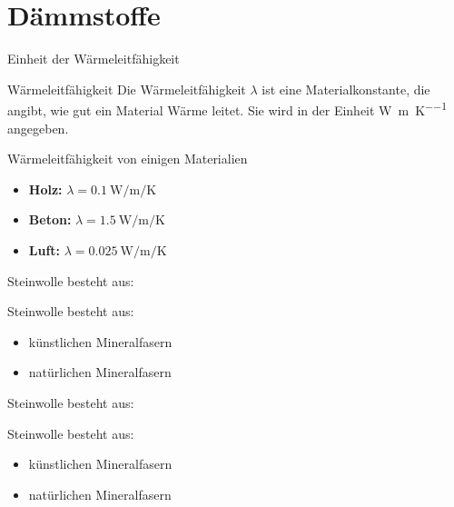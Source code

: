 \section{Dämmstoffe}
\BlueSectionSlide
\begin{frame}{Einheit der Wärmeleitfähigkeit}
	\begin{Definition_BS}{Wärmeleitfähigkeit}
		Die Wärmeleitfähigkeit $\lambda$ ist eine Materialkonstante, die angibt, wie gut ein Material Wärme leitet. Sie wird in der Einheit \si{\watt\per\meter\per\kelvin} angegeben.
	\end{Definition_BS}
	\pause
	\begin{Beispiel}{Wärmeleitfähigkeit von einigen Materialien}
		\begin{itemize}
			\item[\textbullet] \textbf{Holz:} $\lambda = \SI{0.1}{\watt\per\meter\per\kelvin}$
			\item[\textbullet] \textbf{Beton:} $\lambda = \SI{1.5}{\watt\per\meter\per\kelvin}$
			\item[\textbullet] \textbf{Luft:} $\lambda = \SI{0.025}{\watt\per\meter\per\kelvin}$
		\end{itemize}
	\end{Beispiel}
\end{frame}

\begin{frame}{Steinwolle besteht aus:}
    \begin{Fragenblock}
        Steinwolle besteht aus:
        
        \begin{itemize}
            \item[\faSquare] künstlichen Mineralfasern
            \item[\faSquare] natürlichen Mineralfasern
        \end{itemize}
    \end{Fragenblock}
\end{frame}

\begin{frame}{Steinwolle besteht aus:}
    \begin{Fragenblock}
        Steinwolle besteht aus:
        
        \begin{itemize}
			\item[\textcolor{green!70!black}{\faCheckSquare}] künstlichen Mineralfasern
			\item[\faSquare] natürlichen Mineralfasern
        \end{itemize}
    \end{Fragenblock}
\end{frame}

